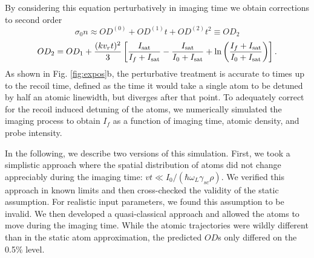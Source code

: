 \documentclass[12pt]{iopart}
\begin{document}
\par By considering this equation perturbatively in imaging time we obtain corrections to second order \cite{LJLthesis}
\begin{equation}
\sigma_0n\approx OD^{(0)}+OD^{(1)}t+OD^{(2)}t^2\equiv OD_2
\end{equation}
\begin{equation}
OD_2= OD_1+\frac{(kv_rt)^2}{3}\left[\frac{I_{\rm{sat}}}{I_f+I_{\rm{sat}}}-\frac{I_{\rm{sat}}}{I_0+I_{\rm{sat}}}+\mathrm{ln}\left(\frac{I_f+I_{\rm{sat}}}{I_0+I_{\rm{sat}}}\right)\right].
\label{eq:OD2}
\end{equation}
As shown in  Fig. \ref{fig:expos}b, the perturbative treatment is accurate to times up to the recoil time, defined as the time it would take a single atom to be detuned by half an atomic linewidth, but diverges after that point. To adequately correct for the recoil induced detuning of the atoms, we numerically simulated the imaging process to obtain $I_f$ as a function of imaging time, atomic density, and probe intensity. 
\par In the following, we describe two versions of this simulation. First, we took a simplistic approach where the spatial distribution of atoms did not change appreciably during the imaging time: $vt\ll I_0/(\hbar \omega_L \gamma_{sc} \rho)$. We verified this approach in known limits and then cross-checked the validity of the static assumption. For realistic input parameters, we found this assumption to be invalid. We then developed a quasi-classical approach and allowed the atoms to move during the imaging time. While the atomic trajectories were wildly different than in the static atom approximation, the predicted $OD$s only differed on the 0.5$\%$ level. 
\end{document}
